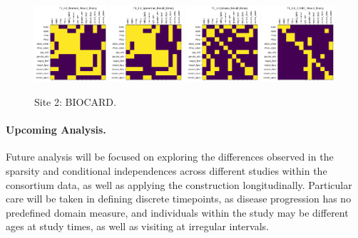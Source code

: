 \begin{figure}
    \includegraphics[width=0.24\textwidth]{chap6/figs/T1_2.0_Pearson_Result_Binary.png}
    \includegraphics[width=0.24\textwidth]{chap6/figs/T1_2.0_Spearman_Result_Binary.png}
    \includegraphics[width=0.24\textwidth]{chap6/figs/T1_2.0_Glasso_Result_Binary.png}
    \includegraphics[width=0.24\textwidth]{chap6/figs/T1_2.0_CODEC_Result_Binary.png}
    \caption{Site 2: BIOCARD.}
    \label{fig:site2}
\end{figure}

\paragraph{Upcoming Analysis.} Future analysis will be focused on exploring the differences observed in the sparsity and conditional independences across different studies within the consortium data, as well as applying the construction longitudinally. Particular care will be taken in defining discrete timepoints, as disease progression has no predefined domain measure, and individuals within the study may be different ages at study times, as well as visiting at irregular intervals.
